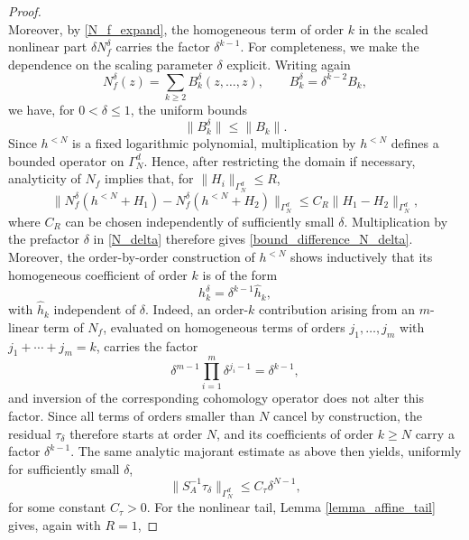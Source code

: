 \documentclass{amsart}
\theoremstyle{plain}
\theoremstyle{definition}
\begin{document}
\begin{proof}
\begin{equation}
\end{equation}
Moreover, by \eqref{N_f_expand}, the homogeneous term of order
$k$ in the scaled nonlinear part $\delta N_f^\delta$ carries the
factor $\delta^{k-1}$. For completeness, we make the dependence on the scaling parameter $\delta$ explicit. Writing again
\begin{equation}
N_f^\delta(z)
=
\sum_{k\geq 2} B_k^\delta(z,\ldots,z),
\qquad
B_k^\delta=\delta^{k-2}B_k,
\end{equation}
we have, for $0<\delta\leq 1$, the uniform bounds
\begin{equation}
\|B_k^\delta\|\leq \|B_k\|.
\end{equation}
Since $h^{<N}$ is a fixed logarithmic polynomial, multiplication by
$h^{<N}$ defines a bounded operator on $\Gamma_N^d$. Hence, after
restricting the domain if necessary, analyticity of $N_f$ implies that,
for $\|H_i\|_{\Gamma_N^d}\leq R$,
\begin{equation}
\bigl\|
N_f^\delta(h^{<N}+H_1)
-
N_f^\delta(h^{<N}+H_2)
\bigr\|_{\Gamma_N^d}
\leq
C_R\|H_1-H_2\|_{\Gamma_N^d},
\end{equation}
where $C_R$ can be chosen independently of sufficiently small $\delta$.
Multiplication by the prefactor $\delta$ in \eqref{N_delta} therefore gives
\eqref{bound_difference_N_delta}. Moreover, the order-by-order construction of $h^{<N}$ shows inductively that its homogeneous coefficient of order $k$ is of
the form
\begin{equation}
h_k^\delta=\delta^{k-1}\widehat h_k,
\end{equation}
with $\widehat h_k$ independent of $\delta$. Indeed, an order-$k$
contribution arising from an $m$-linear term of $N_f$, evaluated on
homogeneous terms of orders $j_1,\ldots,j_m$ with
$j_1+\cdots+j_m=k$, carries the factor
\begin{equation}
\delta^{m-1}\prod_{i=1}^m\delta^{j_i-1}
=
\delta^{k-1},
\end{equation}
and inversion of the corresponding cohomology operator does not alter
this factor. Since all terms of orders smaller than $N$ cancel by
construction, the residual $\tau_\delta$ therefore starts at order $N$,
and its coefficients of order $k\geq N$ carry a factor $\delta^{k-1}$. The same analytic majorant estimate as above then yields, uniformly for sufficiently small $\delta$,
\begin{equation}\label{bound_residual_revised}
\|S_A^{-1}\tau_\delta\|_{\Gamma_N^d}
\leq
C_\tau\delta^{N-1},
\end{equation}
for some constant $C_\tau>0$. For the nonlinear tail, Lemma \ref{lemma_affine_tail} gives, again with $R=1$,

\end{proof}
\end{document}
